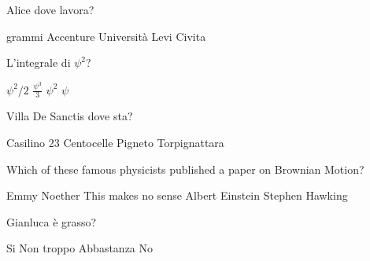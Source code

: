 \documentclass{exam}
\begin{document}
\begin{center}
\end{center}
\vspace{5mm}
\vspace{5mm}
\vspace{5mm}
\begin{questions}
\question[10] Alice dove lavora?
\begin{choices}
 grammi
\choice Accenture
\choice Università
\choice Levi Civita
\end{choices}
\question[10] L'integrale di $\psi^{2}$?
\begin{choices}
\choice $\psi^{2}/2$
\choice $\frac{\psi^{3}}{3}$
\choice $\psi^{2}$
\choice $\psi$
\end{choices}
\question[10] Villa De Sanctis dove sta?
\begin{choices}
\choice Casilino 23
\choice Centocelle
\choice Pigneto
\choice Torpignattara
\end{choices}
\question[10] Which of these famous physicists published a paper on Brownian Motion?
\begin{choices}
\choice Emmy Noether
\choice This makes no sense
\choice Albert Einstein
\choice Stephen Hawking 
\end{choices}
\question[10] Gianluca è grasso?
\begin{choices}
\choice Si
\choice Non troppo
\choice Abbastanza
\choice No
\end{choices}
\end{questions}
           
\end{document}
